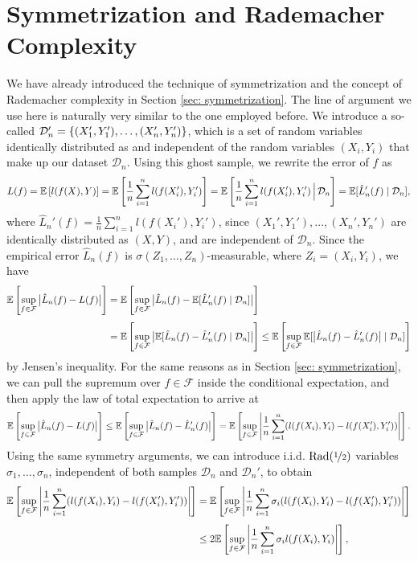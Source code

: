 \section{Symmetrization and Rademacher Complexity}

We have already introduced the technique of symmetrization and the concept of Rademacher complexity in Section \ref{sec: symmetrization}. The line of argument we use here is naturally very similar to the one employed before. We introduce a so-called  $\mathcal{D}_n' = \left\{(X_1', Y_1'), \dots, (X_n', Y_n')\right\}$, which is a set of random variables identically distributed as and independent of the random variables $(X_i, Y_i)$ that make up our dataset $\mathcal{D}_n$. Using this ghost sample, we rewrite the error of $f$ as
\[
    L(f) = \mathbb{E}\left[l(f(X), Y)\right] = \mathbb{E}\left[\frac{1}{n} \sum_{i=1}^n l(f(X_i'), Y_i')\right] = \mathbb{E}\left[\frac{1}{n} \sum_{i=1}^n l(f(X_i'), Y_i') \,\Big\vert\, \mathcal{D}_n\right] = \mathbb{E}[\hat L_n'(f) \mathrel{|} \mathcal{D}_n],
\]
where $\hat L_n'(f) = \frac{1}{n} \sum_{i=1}^n l(f(X_i'), Y_i')$, since $(X_1', Y_1'), \dots, (X_n', Y_n')$ are identically distributed as $(X, Y)$, and are independent of $\mathcal{D}_n$. Since the empirical error $\hat L_n(f)$ is $\sigma(Z_1, \dots, Z_n)$-measurable, where $Z_i = (X_i, Y_i)$, we have
\begin{align*}
    \mathbb{E}\left[ \sup_{f \in \mathcal{F}} \big\lvert\hat L_n(f) - L(f)\big\rvert \right] &= \mathbb{E}\left[ \sup_{f \in \mathcal{F}} \big\lvert\hat L_n(f) - \mathbb{E}[\hat L_n'(f) \mathrel{|} \mathcal{D}_n]\big\rvert \right] \\[4pt]
        &= \mathbb{E}\left[ \sup_{f \in \mathcal{F}} \big\lvert\mathbb{E}[\hat L_n(f) -\hat L_n'(f) \mathrel{|} \mathcal{D}_n]\big\rvert \right] \leq \mathbb{E}\left[ \sup_{f \in \mathcal{F}} \mathbb{E}[ \big\lvert\hat L_n(f) -\hat L_n'(f)\big\rvert \mathrel{|} \mathcal{D}_n] \right]
\end{align*}
by Jensen's inequality. For the same reasons as in Section \ref{sec: symmetrization}, we can pull the supremum over $f \in \mathcal{F}$ inside the conditional expectation, and then apply the law of total expectation to arrive at
\[
    \mathbb{E}\left[ \sup_{f \in \mathcal{F}} \big\lvert\hat L_n(f) - L(f)\big\rvert \right] \leq \mathbb{E}\left[ \sup_{f \in \mathcal{F}} \big\lvert\hat L_n(f) -\hat L_n'(f)\big\rvert \right] = \mathbb{E}\left[ \sup_{f \in \mathcal{F}} \abs{\frac{1}{n} \sum_{i=1}^n (l(f(X_i), Y_i) - l(f(X_i'), Y_i'))} \right].
\]
Using the same symmetry arguments, we can introduce i.i.d. $\mathrm{Rad}(\nicefrac{1}{2})$ variables $\sigma_1, \dots, \sigma_n$, independent of both samples $\mathcal{D}_n$ and $\mathcal{D}_n'$, to obtain
\begin{align*}
    \mathbb{E}\left[ \sup_{f \in \mathcal{F}} \abs{\frac{1}{n} \sum_{i=1}^n (l(f(X_i), Y_i) - l(f(X_i'), Y_i'))} \right] &= \mathbb{E}\left[ \sup_{f \in \mathcal{F}} \abs{\frac{1}{n} \sum_{i=1}^n \sigma_i (l(f(X_i), Y_i) - l(f(X_i'), Y_i'))} \right] \\[4pt]
        &\leq 2 \mathbb{E}\left[ \sup_{f \in \mathcal{F}} \abs{\frac{1}{n} \sum_{i=1}^n \sigma_i l(f(X_i), Y_i)}\right],
\end{align*}
